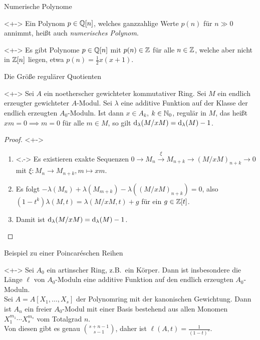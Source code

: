 \begin{frame}{Numerische Polynome}
	\begin{remark}<+->
		Ein Polynom \(p \in \mathbb Q[n]\), welches ganzzahlige Werte \(p(n)\) für
		\(n \gg 0\) annimmt, heißt auch \emph{numerisches Polynom}.
	\end{remark}
	\begin{example}<+->
		Es gibt Polynome \(p \in \mathbb Q[n]\) mit \(p(n) \in \mathbb Z\) für alle
		\(n \in \mathbb Z\), welche aber nicht in \(\mathbb Z[n]\) liegen, etwa
		\(p(n) = \frac 1 2 x(x + 1)\).
	\end{example}
\end{frame}

\begin{frame}{Die Größe regulärer Quotienten}
	\begin{proposition}<+->
		Sei \(A\) ein noetherscher gewichteter kommutativer Ring. Sei
		\(M\) ein endlich erzeugter gewichteter \(A\)-Modul. Sei \(\lambda\) eine additive
		Funktion auf der Klasse der endlich erzeugten \(A_0\)-Moduln. Ist dann
		\(x \in A_k\), \(k \in \mathbb N_0\), regulär in \(M\), das heißt
		\(x m = 0 \implies m = 0\) für alle \(m \in M\), so gilt
		\(\operatorname{d}_\lambda(M/x M) = \operatorname{d}_\lambda(M) - 1\).
	\end{proposition}
	\begin{proof}<+->
		\begin{enumerate}[<+->]
		\item<.->
			Es existieren exakte Sequenzen \(0 \to M_n \xrightarrow{\xi} 
			M_{n + k} \to (M/x M)_{n + k} \to 0\) mit \(\xi\colon M_n \to M_{n + k},
			m \mapsto x m\).
		\item
			Es folgt \(- \lambda(M_n) + \lambda(M_{m + k}) - \lambda((M/xM)_{n + k}) = 0\),
			also \((1 - t^k) \lambda(M, t) = \lambda(M/xM, t) + g\) für ein \(g \in \mathbb Z[t]\).
		\item
			Damit ist \(\operatorname{d}_\lambda(M/x M) = \operatorname{d}_\lambda(M) - 1\).
			\qedhere
		\end{enumerate}
	\end{proof}
\end{frame}

\begin{frame}{Beispiel zu einer Poincaréschen Reihen}
	\begin{example}<+->
		Sei \(A_0\) ein artinscher Ring, z.B.\ ein Körper. Dann ist insbesondere die Länge \(\ell\) von
		\(A_0\)-Moduln eine additive Funktion auf den endlich erzeugten \(A_0\)-Moduln.
		\\
		Sei \(A = A[X_1, \dotsc, X_s]\) der Polynomring mit der kanonischen Gewichtung.
		Dann ist \(A_n\) ein freier \(A_0\)-Modul mit einer Basis bestehend
		aus allen Monomen \(X_1^{m_1} \dotsm X_s^{m_s}\) vom Totalgrad \(n\).
		\\
		Von diesen gibt es genau \(\binom{s + n - 1}{s - 1}\), daher ist
		\(\ell(A, t) = \frac{1}{(1 - t)^s}\).
	\end{example}
\end{frame}

